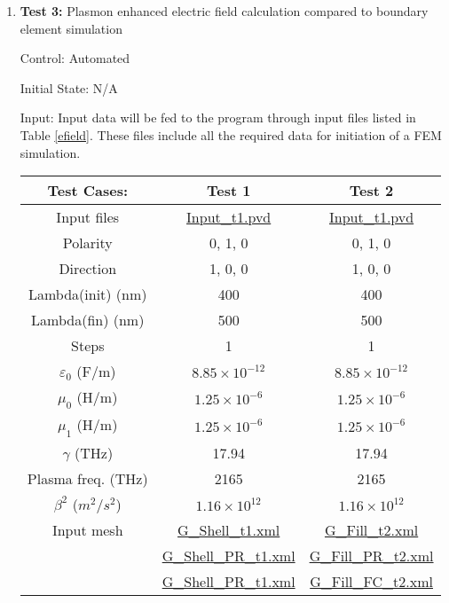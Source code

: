 \documentclass[12pt, titlepage]{article}
\begin{document}
\begin{enumerate}
	
	\item{\textbf{Test 3:} Plasmon enhanced electric field calculation compared to boundary element simulation\\}
	
	Control: Automated 
	
	Initial State: N/A 
	
	Input: Input data will be fed to the program through input files listed in Table \ref{efield}. These files include all the required data for initiation of a FEM simulation.
	
	\begin{table}
		\centering
		\begin{tabular}{|c|c|c|}
			\hline
			Test Cases: & Test 1 & Test 2  \\
			\hline 
			Input files & \href{https://github.com/shmouses/SPDFM/tree/master/src/Input_t1.pvd}{Input\_t1.pvd} & \href{https://github.com/shmouses/SPDFM/tree/master/src/Input_t1.pvd}{Input\_t1.pvd} \\
			Polarity & 0, 1, 0  & 0, 1, 0  \\
			Direction & 1, 0, 0 & 1, 0, 0  \\
			Lambda(init) (nm) &400 & 400  \\
			Lambda(fin) (nm) &500 & 500  \\
			Steps & 1 & 1  \\
			$\varepsilon_0$ (F/m) & $8.85 \times 10^{-12}$  & $8.85 \times 10^{-12}$ \\
			$\mu_0$ (H/m) & $ 1.25 \times 10^{-6}$ & $ 1.25 \times 10^{-6}$ \\
			$\mu_1$ (H/m) & $ 1.25 \times 10^{-6}$ & $ 1.25 \times 10^{-6}$ \\
			$\gamma$ (THz)& 17.94 & 17.94 \\
			Plasma freq. (THz)& 2165 & 2165 \\
			$\beta^2$ ($m^2/s^2$) & $1.16 \times 10^{12}$ & $1.16 \times 10^{12}$ \\
			\hline 
			Input mesh & \href{https://github.com/shmouses/SPDFM/tree/master/src/G_Shell_t1.xml}{G\_Shell\_t1.xml} & \href{https://github.com/shmouses/SPDFM/tree/master/src/G_Fill_t2.xml}{G\_Fill\_t2.xml} \\
			
			&			 \href{https://github.com/shmouses/SPDFM/tree/master/src/G_Shell_PR_t1.xml}{G\_Shell\_PR\_t1.xml} & \href{https://github.com/shmouses/SPDFM/tree/master/src/G_Fill_PR_t2.xml}{G\_Fill\_PR\_t2.xml} \\
			&		   \href{https://github.com/shmouses/SPDFM/tree/master/src/G_Shell_FC_t1.xml}{G\_Shell\_PR\_t1.xml} & \href{https://github.com/shmouses/SPDFM/tree/master/src/G_Fill_FC_t2.xml}{G\_Fill\_FC\_t2.xml} \\
			 

\end{tabular}
\end{table}
\end{enumerate}
\end{document}
